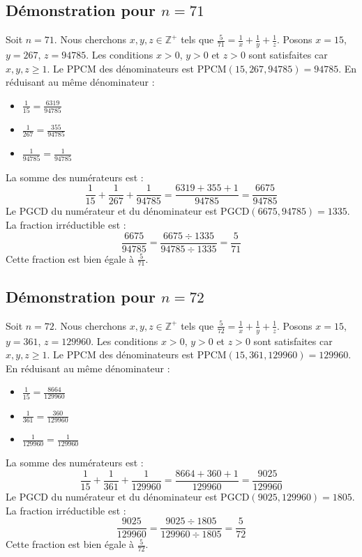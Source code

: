 \documentclass[11pt,a4paper]{article}
\begin{document}
\subsection{Démonstration pour $n = 71$}
Soit $n = 71$. Nous cherchons $x, y, z \in \mathbb{Z}^{+}$ tels que $\frac{5}{71} = \frac{1}{x} + \frac{1}{y} + \frac{1}{z}$.
Posons $x = 15$, $y = 267$, $z = 94785$.
Les conditions $x > 0$, $y > 0$ et $z > 0$ sont satisfaites car $x, y, z \geq 1$.
Le PPCM des dénominateurs est $\text{PPCM}(15, 267, 94785) = 94785$.
En réduisant au même dénominateur :
\begin{itemize}
    \item $\frac{1}{15} = \frac{6319}{94785}$
    \item $\frac{1}{267} = \frac{355}{94785}$
    \item $\frac{1}{94785} = \frac{1}{94785}$
\end{itemize}
La somme des numérateurs est :
$$ \frac{1}{15} + \frac{1}{267} + \frac{1}{94785} = \frac{6319 + 355 + 1}{94785} = \frac{6675}{94785} $$
Le PGCD du numérateur et du dénominateur est $\text{PGCD}(6675, 94785) = 1335$.
La fraction irréductible est :
$$ \frac{6675}{94785} = \frac{6675 \div 1335}{94785 \div 1335} = \frac{5}{71} $$
Cette fraction est bien égale à $\frac{5}{71}$.

\subsection{Démonstration pour $n = 72$}
Soit $n = 72$. Nous cherchons $x, y, z \in \mathbb{Z}^{+}$ tels que $\frac{5}{72} = \frac{1}{x} + \frac{1}{y} + \frac{1}{z}$.
Posons $x = 15$, $y = 361$, $z = 129960$.
Les conditions $x > 0$, $y > 0$ et $z > 0$ sont satisfaites car $x, y, z \geq 1$.
Le PPCM des dénominateurs est $\text{PPCM}(15, 361, 129960) = 129960$.
En réduisant au même dénominateur :
\begin{itemize}
    \item $\frac{1}{15} = \frac{8664}{129960}$
    \item $\frac{1}{361} = \frac{360}{129960}$
    \item $\frac{1}{129960} = \frac{1}{129960}$
\end{itemize}
La somme des numérateurs est :
$$ \frac{1}{15} + \frac{1}{361} + \frac{1}{129960} = \frac{8664 + 360 + 1}{129960} = \frac{9025}{129960} $$
Le PGCD du numérateur et du dénominateur est $\text{PGCD}(9025, 129960) = 1805$.
La fraction irréductible est :
$$ \frac{9025}{129960} = \frac{9025 \div 1805}{129960 \div 1805} = \frac{5}{72} $$
Cette fraction est bien égale à $\frac{5}{72}$.
\end{document}

